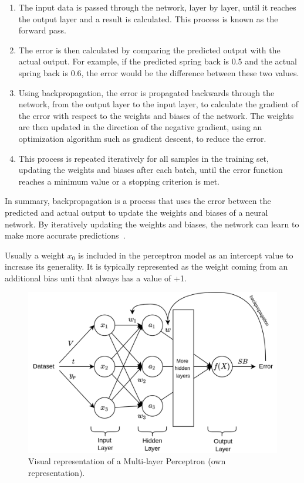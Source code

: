\begin{enumerate}
    \item The input data is passed through the network, layer by layer, until it reaches the output layer and a
    result is calculated. This process is known as the forward pass.
    \item The error is then calculated by comparing the predicted output with the actual output. For example, if the
    predicted spring back is 0.5 and the actual spring back is 0.6, the error would be the difference between
    these two values.
    \item Using backpropagation, the error is propagated backwards through the network, from the output layer
    to the input layer, to calculate the gradient of the error with respect to the weights and biases of the
    network. The weights are then updated in the direction of the negative gradient, using an optimization
    algorithm such as gradient descent, to reduce the error.
    \item This process is repeated iteratively for all
    samples in the training set, updating the weights and biases after each batch, until the error function
    reaches a minimum value or a stopping criterion is met.
\end{enumerate}

In summary, backpropagation is a process that uses the error between the predicted and actual output to update the
weights and biases of a neural network. By iteratively updating the weights and biases, the network can learn to make
more accurate predictions~\cite{nielsen_neuralnetworksdeep_2015}.

Usually a weight $x_0$ is included in the perceptron model as an intercept value to increase its generality.
It is typically represented as the weight coming from an additional bias unti that always has a value of +1.

\begin{figure}[h]
    \begin{tcolorbox}[arc=0pt,boxrule=0.5pt]
        \centering
        \includegraphics[width=1\textwidth]{chap4/images/mlp_example}
    \end{tcolorbox}
    \caption{Visual representation of a Multi-layer Perceptron (own representation).}
    \label{fig:mlp-example}
\end{figure}


